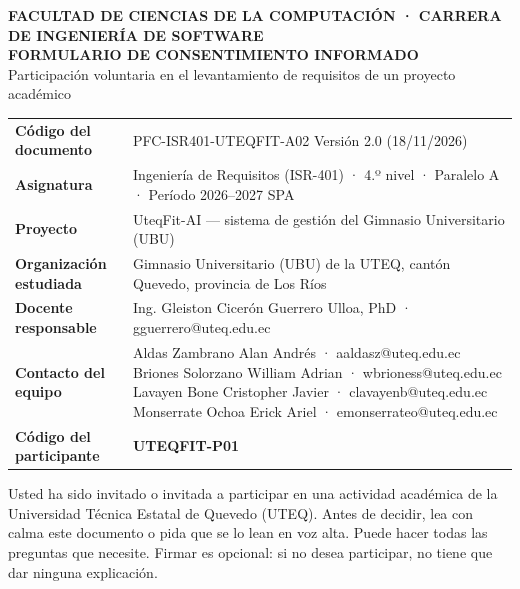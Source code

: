\documentclass[11pt,a4paper]{article}
\begin{document}
\begin{center}
{\small\bfseries\color{azul}FACULTAD DE CIENCIAS DE LA COMPUTACIÓN · CARRERA DE INGENIERÍA DE SOFTWARE}\\[2pt]
{\LARGE\bfseries\color{verde}FORMULARIO DE CONSENTIMIENTO INFORMADO}\\[4pt]
Participación voluntaria en el levantamiento de requisitos de un proyecto académico
\end{center}

\begin{tcolorbox}[colback=white,colframe=verde!60,arc=2mm,boxrule=0.5pt,left=2mm,right=2mm]
\small
\begin{tabularx}{\linewidth}{@{}>{\bfseries\leavevmode\color{verde}}p{4.2cm}X@{}}
Código del documento & PFC-ISR401-UTEQFIT-A02 \quad Versión 2.0 \quad (18/11/2026) \\
Asignatura & Ingeniería de Requisitos (ISR-401) · 4.º nivel · Paralelo A · Período 2026--2027 SPA \\
Proyecto & UteqFit-AI --- sistema de gestión del Gimnasio Universitario (UBU) \\
Organización estudiada & Gimnasio Universitario (UBU) de la UTEQ, cantón Quevedo, provincia de Los Ríos \\
Docente responsable & Ing. Gleiston Cicerón Guerrero Ulloa, PhD · gguerrero@uteq.edu.ec \\
Contacto del equipo & Aldas Zambrano Alan Andrés · aaldasz@uteq.edu.ec\newline
Briones Solorzano William Adrian · wbrioness@uteq.edu.ec\newline
Lavayen Bone Cristopher Javier · clavayenb@uteq.edu.ec\newline
Monserrate Ochoa Erick Ariel · emonserrateo@uteq.edu.ec \\
Código del participante & \textbf{UTEQFIT-P01} \\
\end{tabularx}
\end{tcolorbox}

Usted ha sido invitado o invitada a participar en una actividad académica de la Universidad Técnica Estatal de Quevedo (UTEQ). Antes de decidir, lea con calma este documento o pida que se lo lean en voz alta. Puede hacer todas las preguntas que necesite. Firmar es opcional: si no desea participar, no tiene que dar ninguna explicación.
\end{document}
